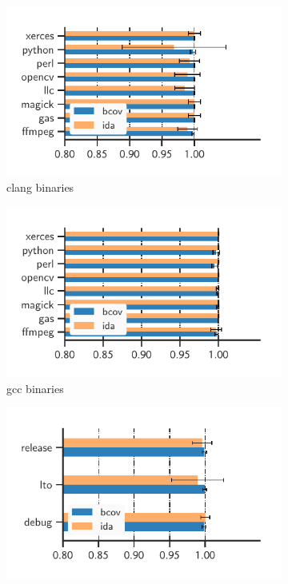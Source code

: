 \begin{figure}[t!]
	\centering
	\small
	\begin{subfigure}[t]{0.27\textwidth}
		\includegraphics[clip, trim=0.48cm 0.4cm 1.71cm 0.65cm, width=\textwidth]{fig/jumptab-clang}
		\caption{\textsf{clang} binaries}
		\label{fig:jumptab-clang}
	\end{subfigure}
	\hspace{10pt}
	\begin{subfigure}[t]{0.28\textwidth}
		\includegraphics[clip, trim=0.48cm 0.4cm 1.6cm 0.65cm, width=\textwidth]{fig/jumptab-gcc}
		\caption{\textsf{gcc} binaries}
		\label{fig:jumptab-gcc}
	\end{subfigure}
	\hspace{10pt}
	\begin{subfigure}[t]{0.28\textwidth}
		\includegraphics[clip, trim=0.48cm 0.38cm 1.6cm 0.8cm, width=\textwidth]{fig/jumptab-build}

\end{subfigure}
\end{figure}
